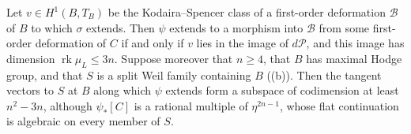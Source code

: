 \begin{proposition}\label{prop:abelprym}
Let $v\in H^{1}(B,T_{B})$ be the Kodaira--Spencer class of a first-order
deformation $\mathcal{B}$ of $B$ to which $\sigma$ extends. Then $\psi$
extends to a morphism into $\mathcal{B}$ from some first-order deformation of
$C$ if and only if $v$ lies in the image of $d\mathcal{P}$, and this image has
dimension $\operatorname{rk}\mu_{L}\le3n$. Suppose moreover that $n\ge4$,
that $B$ has maximal Hodge group, and that $S$ is a split Weil family
containing $B$ ((b)). Then the tangent vectors to $S$ at $B$ along which
$\psi$ extends form a subspace of codimension at least $n^{2}-3n$, although
$\psi_{*}[C]$ is a rational multiple of $\eta^{2n-1}$, whose flat continuation
is algebraic on every member of $S$.
\end{proposition}

